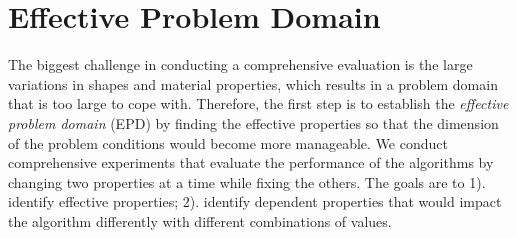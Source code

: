 
\section{Effective Problem Domain}
The biggest challenge in conducting a comprehensive evaluation is the large variations in shapes and material properties, which results in a problem domain that is too large to cope with. Therefore, the first step is to establish the \textit{effective problem domain} (EPD) by finding the effective properties so that the dimension of the problem conditions would become more manageable. We conduct comprehensive experiments that evaluate the performance of the algorithms by changing two properties at a time while fixing the others. The goals are to 1). identify effective properties; 2). identify dependent properties that would impact the algorithm differently with different combinations of values.

